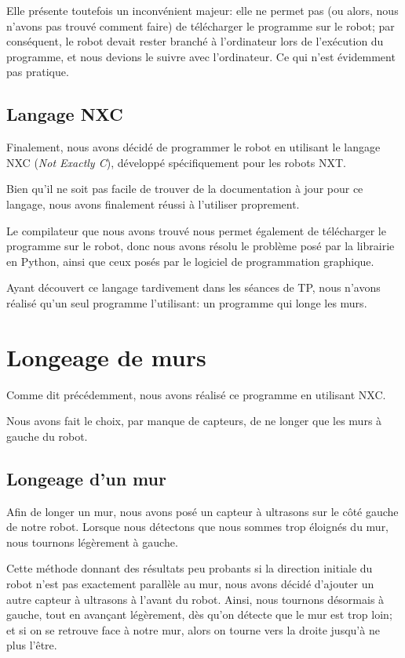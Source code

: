 \documentclass{scrartcl}
\begin{document}
Elle présente toutefois un inconvénient majeur: elle ne permet pas (ou alors,
nous n'avons pas trouvé comment faire) de télécharger le programme sur le
robot; par conséquent, le robot devait rester branché à l'ordinateur lors de
l'exécution du programme, et nous devions le suivre avec l'ordinateur. Ce qui
n'est évidemment pas pratique.

\subsection{Langage NXC}

Finalement, nous avons décidé de programmer le robot en utilisant le
langage NXC (\emph{Not Exactly C}), développé spécifiquement pour
les robots NXT.

Bien qu'il ne soit pas facile de trouver de la documentation à jour pour ce
langage, nous avons finalement réussi à l'utiliser proprement.

Le compilateur que nous avons trouvé nous permet également de
télécharger le programme sur le robot, donc nous avons résolu le
problème posé par la librairie en Python, ainsi que ceux posés par le
logiciel de programmation graphique.

Ayant découvert ce langage tardivement dans les séances de TP, nous n'avons
réalisé qu'un seul programme l'utilisant: un programme qui longe les murs.

\section{Longeage de murs}

Comme dit précédemment, nous avons réalisé ce programme en utilisant
NXC.

Nous avons fait le choix, par manque de capteurs, de ne longer que les murs à
gauche du robot.

\subsection{Longeage d'un mur}

Afin de longer un mur, nous avons posé un capteur à ultrasons sur le
côté gauche de notre robot. Lorsque nous détectons que nous sommes
trop éloignés du mur, nous tournons légèrement à gauche.

Cette méthode donnant des résultats peu probants si la direction
initiale du robot n'est pas exactement parallèle au mur, nous avons
décidé d'ajouter un autre capteur à ultrasons à l'avant du robot. Ainsi,
nous tournons désormais à gauche, tout en avançant légèrement, dès
qu'on détecte que le mur est trop loin; et si on se retrouve face à
notre mur, alors on tourne vers la droite jusqu'à ne plus l'être.
\end{document}
